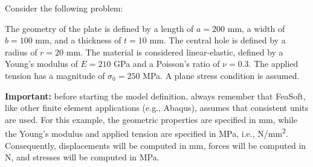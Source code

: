 \documentclass[
    11pt,        %
    a4paper,     %
    final,       %
    fleqn,       %
    notitlepage, %
    onecolumn,   %
    oneside,     %
]{article}
\begin{document}
Consider the following problem:
\begin{center}
\end{center}
The geometry of the plate is defined by a length of $a = 200$ mm, a width of $b = 100$ mm, and a thickness of $t = 10$ mm. The central hole is defined by a radius of $r = 20$ mm. The material is considered linear-elastic, defined by a Young's modulus of $E = 210$ GPa and a Poisson's ratio of $\nu = 0.3$. The applied tension has a magnitude of $\sigma_0 = 250$ MPa. A plane stress condition is assumed.

\textbf{Important:} before starting the model definition, always remember that FeaSoft, like other finite element applications (e.g., Abaqus), assumes that consistent units are used. For this example, the geometric properties are specified in mm, while the Young's modulus and applied tension are specified in MPa, i.e., N/mm\textsuperscript{2}. Consequently, displacements will be computed in mm, forces will be computed in N, and stresses will be computed in MPa.
\end{document}
